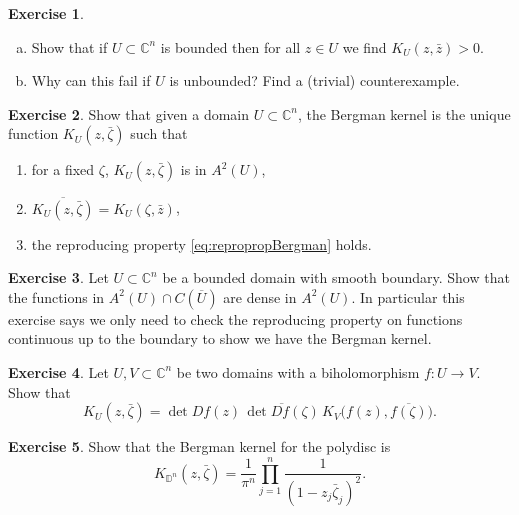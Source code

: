 \documentclass[12pt,openany]{book}
\newcommand{\C}{{\mathbb{C}}}
\newcommand{\D}{{\mathbb{D}}}
\theoremstyle{plain}
\theoremstyle{remark}
\theoremstyle{definition}
\newenvironment{exbox}{%
    \def\FrameCommand{\vrule width 1pt \relax\hspace {10pt}}%
    \MakeFramed {\advance \hsize -\width \FrameRestore }%
}{%
    \endMakeFramed
}
\newenvironment{exparts}{%
    \leavevmode\begin{enumerate}[a),noitemsep,topsep=0pt,parsep=0pt,partopsep=0pt]
}{%
    \end{enumerate}
}
\newenvironment{exnumparts}{%
    \leavevmode\begin{enumerate}[1),noitemsep,topsep=0pt,parsep=0pt,partopsep=0pt]
}{%
    \end{enumerate}
}
\theoremstyle{exercise}
\newtheorem{exercise}{Exercise}[section]
\theoremstyle{example}
\begin{document}
\begin{exbox}
\begin{exercise}
\begin{exparts}
\item
Show that if $U \subset \C^n$ is bounded then for all $z \in U$
we find $K_U(z,\bar{z}) > 0$.
\item
Why can this fail if $U$ is unbounded?
Find a (trivial) counterexample.
\end{exparts}
\end{exercise}

\begin{exercise}
Show that given a domain $U \subset \C^n$, the Bergman kernel is the unique
function $K_U(z,\bar{\zeta})$ such that
\begin{exnumparts}
\item
for a fixed $\zeta$, $K_U(z,\bar{\zeta})$ is in $A^2(U)$,
\item
$\overline{K_U(z,\bar{\zeta})} =
K_U(\zeta,\bar{z})$,
\item
the reproducing property \eqref{eq:repropropBergman}
holds.
\end{exnumparts}
\end{exercise}

\begin{exercise}
Let $U \subset \C^n$ be a bounded domain with smooth boundary. Show that the functions
in $A^2(U) \cap C(\overline{U})$ are dense in $A^2(U)$.  In particular this
exercise says we
only need to check the reproducing property on functions continuous up to
the boundary to show we have the Bergman kernel.
\end{exercise}

\begin{exercise}
Let $U, V \subset \C^n$ be two domains with a biholomorphism $f \colon U \to
V$.  Show that
\begin{equation*}
K_U(z,\bar{\zeta}) = \det D f(z) \, \overline{\det D f (\zeta)} \,
K_V\bigl(f(z),\overline{f(\zeta)}\bigr) .
\end{equation*}
\end{exercise}

\begin{exercise}
Show that the Bergman kernel for the polydisc is
\begin{equation*}
K_{\D^n}(z,\bar{\zeta}) =
\frac{1}{\pi^n} \prod_{j=1}^n \frac{1}{{(1-z_j\bar{\zeta}_j)}^2}.
\end{equation*}
\end{exercise}


\end{exbox}
\end{document}
